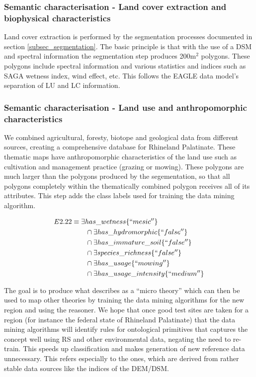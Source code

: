 \documentclass[authoryear, review,12pt,number]{elsarticle}
\begin{document}
\subsubsection{Semantic characterisation - Land cover extraction and biophysical
characteristics} Land cover extraction is performed by the segmentation processes documented in  
section \ref{subsec_segmentation}. The basic principle is that with the use of 
a DSM and spectral information the segmentation step produces 200m$^{2}$ 
polygons. These polygons include spectral information and various statistics 
and indices such as SAGA wetness index, wind effect, etc.   
This follows the EAGLE data model's separation of LU and LC information.

\subsubsection{Semantic characterisation - Land use and anthropomorphic
characteristics} We combined agricultural, foresty, biotope and geological data from different 
sources, creating a comprehensive database for Rhineland Palatinate. These 
thematic maps have anthropomorphic characteristics of the land use such as 
cultivation and management practice (grazing or mowing). These polygons are 
much larger than the polygons produced by the segementation, so that all 
polygons completely within the thematically combined polygon receives all of 
its attributes. This step adds the class labels used for training the data 
mining algorithm. 

\begin{equation}
\begin{align*}
E2.22 &\equiv \exists has\_wetness \{``mesic''\} \\
&\qquad {} \cap \exists has\_hydromorphic \{``false''\} \\
&\qquad {} \cap \exists has\_immature\_soil \{``false''\} \\
&\qquad {} \cap \exists species\_richness \{``false''\} \\
&\qquad {} \cap \exists has\_usage \{``mowing''\} \\
&\qquad {} \cap \exists has\_usage\_intensity \{``medium''\} \\
\end{align*}
\label{eq:description_logic}
\end{equation}


The goal is to produce what \cite{Janowicz2012} describes as a
``micro theory'' which can then be used to map other theories
by training the data mining algorithms for the new region and using the
reasoner. We hope that once good test sites are taken for a region (for instance
the federal state of Rhineland Palatinate) that the data mining algorithms will
identify rules for ontological primitives that captures the concept well using
RS and other environmental data, negating the need to re-train. This speeds
up classification and makes generation of new reference data unnecessary. This
refers especially to the ones, which are derived from rather stable data sources
like the indices of the DEM/DSM.
\end{document}
